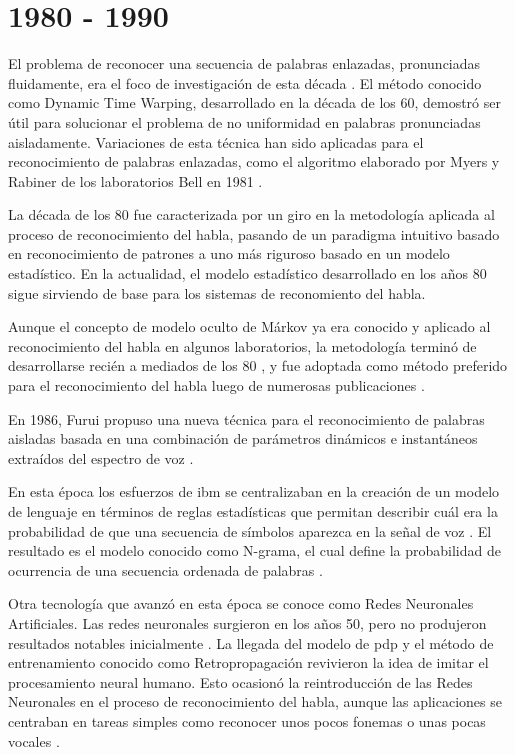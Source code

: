 \section{1980 - 1990}
\label{sec:80s}

El problema de reconocer una secuencia de palabras enlazadas, pronunciadas fluidamente, era el foco
de investigaci\'{o}n de esta d\'{e}cada \cite{Furui50Years2004}. El m\'{e}todo conocido como 
Dynamic Time Warping, desarrollado en la d\'{e}cada de los 60, demostr\'{o} ser \'{u}til para solucionar el problema de no uniformidad
en palabras pronunciadas aisladamente. Variaciones de esta t\'{e}cnica han sido aplicadas para el 
reconocimiento de palabras enlazadas, como el algoritmo elaborado por Myers y Rabiner de los laboratorios Bell
en 1981 \cite{MyersALevel1981}.

La d\'{e}cada de los 80 fue caracterizada por un giro en la metodolog\'{i}a aplicada al proceso de
reconocimiento del habla, pasando de un paradigma intuitivo basado en reconocimiento de patrones 
a uno m\'{a}s riguroso basado en un modelo estad\'{i}stico. En la actualidad, el modelo estad\'{i}stico
desarrollado en los a\~{n}os 80 sigue sirviendo de base para los sistemas de reconomiento del habla.

Aunque el concepto de modelo oculto de M\'{a}rkov ya era conocido y aplicado al reconocimiento del habla 
en algunos laboratorios, la metodolog\'{i}a termin\'{o} de desarrollarse reci\'{e}n a mediados 
de los 80 \cite{JuangAutomaticSpeech}, y fue adoptada como m\'{e}todo preferido para el reconocimiento 
del habla luego de numerosas publicaciones \cite{LevinsonAnIntroduction1983, FergusonHidden1980}.

En 1986, Furui propuso una nueva t\'{e}cnica para el reconocimiento de palabras aisladas basada en
una combinaci\'{o}n de par\'{a}metros din\'{a}micos e instant\'{a}neos 
extra\'{i}dos del espectro de voz \cite{FuruiSpeaker1986}.

En esta \'{e}poca los esfuerzos de \gls{ibm} se centralizaban en la creaci\'{o}n de un modelo de lenguaje 
en t\'{e}rminos de reglas estad\'{i}sticas que permitan describir cu\'{a}l era la probabilidad de que una 
secuencia de s\'{i}mbolos aparezca en la se\~{n}al de voz \cite{Furui50Years2004}. El resultado es el
modelo conocido como N-grama, el cual define la probabilidad de ocurrencia de una secuencia ordenada
de palabras \cite{JelinekTheDevelopment1986}.

Otra tecnolog\'{i}a que avanz\'{o} en esta \'{e}poca se conoce como Redes Neuronales Artificiales. Las 
redes neuronales surgieron en los a\~{n}os 50, pero no produjeron resultados notables 
inicialmente \cite{JuangAutomaticSpeech}. La llegada del modelo de \gls{pdp} y el m\'{e}todo de entrenamiento conocido como Retropropagaci\'{o}n
revivieron la idea de imitar el procesamiento neural humano. Esto ocasion\'{o} la reintroducci\'{o}n de
las Redes Neuronales en el proceso de reconocimiento del habla, aunque las aplicaciones se centraban en tareas simples
como reconocer unos pocos fonemas o unas pocas vocales \cite{JuangAutomaticSpeech}.

